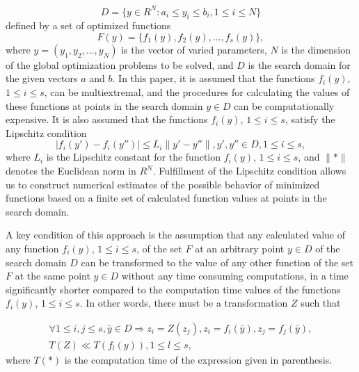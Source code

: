 \documentclass[review]{elsarticle}
\begin{document}
\begin{equation}\label{eq:2}
D  = \{ y\in R^N: a_i \leq y_i \leq b_i, 1 \leq i \leq N \}
\end{equation}
defined by a set of optimized functions
\begin{equation}\label{eq:3}
F(y) = \{ f_1(y),  f_2(y),\dots, f_s(y) \},
\end{equation}
where $y = (y_1,y_2,\dots,y_N)$ is the vector of varied parameters, $N$ is the dimension of the global optimization problems to be solved, and $D$ is the search domain for the given vectors $a$ and $b$. 
In this paper, it is assumed that the functions $f_i(y)$, $1 \leq i \leq s$, can be multiextremal, and the procedures for calculating the values of these functions at points in the search domain $y \in D$ can be computationally expensive. It is also assumed that the functions $f_i(y)$, $1 \leq i \leq s$, satisfy the Lipschitz condition
\begin{equation}\label{eq:4}
|f_i (y')-f_i (y'')| \leq L_i \|y'-y''\|, y',y''\in D, 1 \leq i \leq s,
\end{equation}
where $L_i$ is the Lipschitz constant for the function $f_i(y)$, $1 \leq i \leq s$, and ${\|*\|}$ denotes the Euclidean norm in $R^N$. Fulfillment of the Lipschitz condition allows us to construct numerical estimates of the possible behavior of minimized functions based on a finite set of calculated function values at points in the search domain.

A key condition of this approach is the assumption that any calculated value of any function $f_i(y)$, $1 \leq i \leq s$, of the set $F$ at an arbitrary point $y \in D$ of the search domain $D$ can be transformed to the value of any other function of the set $F$ at the same point $y \in D$ without any time consuming computations, in a time significantly shorter compared to the computation time values of the functions $f_i(y)$, $1 \leq i \leq s$. In other words, there must be a transformation $Z$ such that

\begin{equation}\label{eq:5}
\begin{matrix}
\forall 1 \leq i, j \leq s, \bar{y} \in D \Rightarrow z_i=Z(z_j ), z_i = f_i (\bar{y}),z_j=f_j (\bar{y}), \\
T(Z) \ll T(f_l (y) ),1 \leq l \leq s,
\end{matrix}
\end{equation}
where $T(*)$ is the computation time of the expression given in parenthesis.
\end{document}
